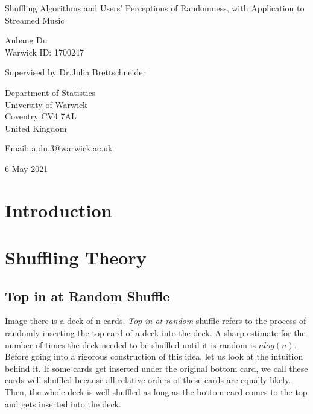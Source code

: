 \documentclass[12pt]{article}
\theoremstyle{plain}
\theoremstyle{definition}
\theoremstyle{remark}
\begin{document}
\thispagestyle{empty}
\begin{center}
{\Huge Shuffling Algorithms and Users’ Perceptions of Randomness, with Application to Streamed Music

\bigskip
\bigskip


\bigskip
\bigskip

\huge Anbang Du\\
\vspace{5pt}
\huge Warwick ID: 1700247\\
\bigskip
\bigskip
\bigskip


\LARGE Supervised by Dr.Julia Brettschneider}
\end{center}
\vfill

\begin{center}
{\Large
Department of Statistics\\
University of Warwick\\
Coventry CV4 7AL\\
United Kingdom\\
\medskip

Email: a.du.3@warwick.ac.uk \\
\medskip

6 May 2021 }
\end{center}
\bigskip

\newpage




\tableofcontents

\clearpage


\section{Introduction}


\section{Shuffling Theory}
\subsection{Top in at Random Shuffle}

Image there is a deck of n cards. \textit{Top in at random}\cite[Example~1 on \pno~333]{1.1} shuffle refers to the process of randomly inserting the top card of a deck into the deck. A sharp estimate for the number of times the deck needed to be shuffled until it is random is $nlog(n)$. Before going into a rigorous construction of this idea, let us look at the intuition behind it. If some cards get inserted under the original bottom card, we call these cards well-shuffled because all relative orders of these cards are equally likely. Then, the whole deck is well-shuffled as long as the bottom card comes to the top and gets inserted into the deck. 
\end{document}
